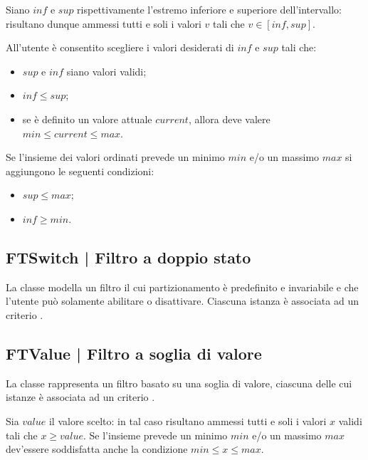 \documentclass[10pt,a4paper,headinclude,footinclude,hidelinks]{scrreprt} %
\begin{document}
	Siano $inf$ e $sup$ rispettivamente l'estremo inferiore e superiore dell'intervallo: risultano dunque ammessi tutti e soli i valori $v$ tali che $v \in \left[inf,sup\right]$.

	All'utente è consentito scegliere i valori desiderati di $inf$ e $sup$ tali che:
	\begin{itemize}
	\item $sup$ e $inf$ siano valori validi;
	\item $inf \leq sup$;
	\item se è definito un valore attuale $current$, allora deve valere $min \leq current \leq max$.
	\end{itemize}

	Se l'insieme dei valori ordinati prevede un minimo $min$ e/o un massimo $max$ si aggiungono le seguenti condizioni:
	\begin{itemize}
	\item $sup \leq max$;
	\item $inf \geq min$.
	\end{itemize}

	\subsection[FTSwitch]{FTSwitch | Filtro a doppio stato}
	\label{sec:stage:design:sistema:model.filter:switch-filter}
	La classe \textit{} modella un filtro il cui partizionamento è predefinito e invariabile e che l'utente può solamente abilitare o disattivare. Ciascuna istanza è associata ad un criterio \textit{}.

	\subsection[FTValue]{FTValue | Filtro a soglia di valore}
	\label{sec:stage:design:sistema:model.filter:value-filter}
	La classe \textit{} rappresenta un filtro basato su una soglia di valore, ciascuna delle cui istanze è associata ad un criterio \textit{}.

	Sia $value$ il valore scelto: in tal caso risultano ammessi tutti e soli i valori $x$ validi tali che $x \geq value$. Se l'insieme prevede un minimo $min$ e/o un massimo $max$ dev'essere soddisfatta anche la condizione $min \leq x \leq max$.
\end{document}
